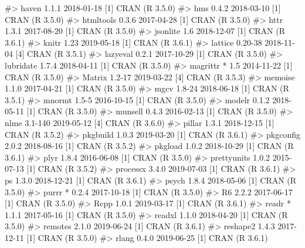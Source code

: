 \documentclass[
]{jss}
\begin{document}
\begin{CodeChunk}
\begin{CodeOutput}
#>  haven         1.1.1      2018-01-18 [1] CRAN (R 3.5.0)                  
#>  hms           0.4.2      2018-03-10 [1] CRAN (R 3.5.0)                  
#>  htmltools     0.3.6      2017-04-28 [1] CRAN (R 3.5.0)                  
#>  httr          1.3.1      2017-08-20 [1] CRAN (R 3.5.0)                  
#>  jsonlite      1.6        2018-12-07 [1] CRAN (R 3.6.1)                  
#>  knitr         1.23       2019-05-18 [1] CRAN (R 3.6.1)                  
#>  lattice       0.20-38    2018-11-04 [4] CRAN (R 3.5.1)                  
#>  lazyeval      0.2.1      2017-10-29 [1] CRAN (R 3.5.0)                  
#>  lubridate     1.7.4      2018-04-11 [1] CRAN (R 3.5.0)                  
#>  magrittr    * 1.5        2014-11-22 [1] CRAN (R 3.5.0)                  
#>  Matrix        1.2-17     2019-03-22 [4] CRAN (R 3.5.3)                  
#>  memoise       1.1.0      2017-04-21 [1] CRAN (R 3.5.0)                  
#>  mgcv          1.8-24     2018-06-18 [1] CRAN (R 3.5.1)                  
#>  mnormt        1.5-5      2016-10-15 [1] CRAN (R 3.5.0)                  
#>  modelr        0.1.2      2018-05-11 [1] CRAN (R 3.5.0)                  
#>  munsell       0.4.3      2016-02-13 [1] CRAN (R 3.5.0)                  
#>  nlme          3.1-140    2019-05-12 [4] CRAN (R 3.6.0)                  
#>  pillar        1.3.1      2018-12-15 [1] CRAN (R 3.5.2)                  
#>  pkgbuild      1.0.3      2019-03-20 [1] CRAN (R 3.6.1)                  
#>  pkgconfig     2.0.2      2018-08-16 [1] CRAN (R 3.5.2)                  
#>  pkgload       1.0.2      2018-10-29 [1] CRAN (R 3.6.1)                  
#>  plyr          1.8.4      2016-06-08 [1] CRAN (R 3.5.0)                  
#>  prettyunits   1.0.2      2015-07-13 [1] CRAN (R 3.5.2)                  
#>  processx      3.4.0      2019-07-03 [1] CRAN (R 3.6.1)                  
#>  ps            1.3.0      2018-12-21 [1] CRAN (R 3.6.1)                  
#>  psych         1.8.4      2018-05-06 [1] CRAN (R 3.5.0)                  
#>  purrr       * 0.2.4      2017-10-18 [1] CRAN (R 3.5.0)                  
#>  R6            2.2.2      2017-06-17 [1] CRAN (R 3.5.0)                  
#>  Rcpp          1.0.1      2019-03-17 [1] CRAN (R 3.6.1)                  
#>  readr       * 1.1.1      2017-05-16 [1] CRAN (R 3.5.0)                  
#>  readxl        1.1.0      2018-04-20 [1] CRAN (R 3.5.0)                  
#>  remotes       2.1.0      2019-06-24 [1] CRAN (R 3.6.1)                  
#>  reshape2      1.4.3      2017-12-11 [1] CRAN (R 3.5.0)                  
#>  rlang         0.4.0      2019-06-25 [1] CRAN (R 3.6.1)                  

\end{CodeOutput}
\end{CodeChunk}
\end{document}
